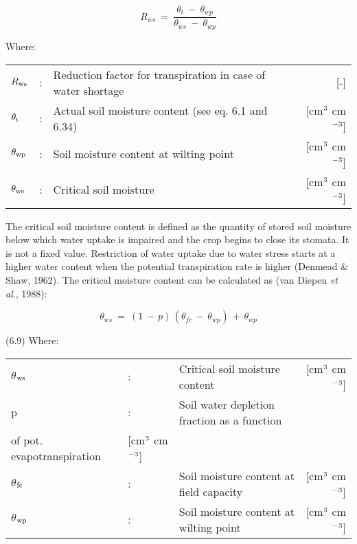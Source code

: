 \begin{equation}
R_{ws} ~=~{\frac{\theta  _{t} ~-~ \theta  _{wp} }{ \theta  _{ws} ~-~ \theta  _{wp} }}
\end{equation}

Where:\\
\begin{tabularx}{\textwidth}{llXr}
$R_{{\rm ws}}$ &:& Reduction factor for transpiration in case of
    water shortage & [-]\\
$\theta_{{\rm t}}$ &:& Actual soil moisture content (see eq. 6.1 and 
    6.34) & [cm$^{{\rm 3}}$ cm$^{{\rm -3}}$]\\
$\theta_{{\rm wp}}$ &:& Soil moisture content at wilting 
    point & [cm$^{{\rm 3}}$ cm$^{{\rm -3}}$]\\
$\theta_{{\rm ws}}$ &:& Critical soil moisture & [cm$^{{\rm 3}}$ cm$^{{\rm -3}}$]\\ 
\end{tabularx}



The critical soil moisture content is defined as the quantity of stored soil moisture below
which water uptake is impaired and the crop begins to close its stomata. It is not a fixed
value. Restriction of water uptake due to water stress starts at a higher water content
when the potential transpiration rate is higher (Denmead \& Shaw, 1962). The critical
moisture content can be calculated as (van Diepen {\it et al\/}., 1988):

\begin{equation}
\theta  _{ws} ~=~ (1\, -\, p )\, (\theta  _{fc} \, -\, \theta  _{wp} )\, +\, \theta  _{wp} 
\end{equation}

 
\strut\hfill (6.9)
Where:\\
\begin{tabularx}{\textwidth}{llXr}



 $\theta$$_{{\rm ws}}$ &:& Critical soil moisture content & [cm$^{{\rm 3}}$ cm$^{{\rm -3}}$]\\
 p &:& Soil water depletion fraction as a function \\
      of pot. evapotranspiration & [cm$^{{\rm 3}}$ cm$^{{\rm -3}}$]\\
 $\theta$$_{{\rm fc}}$ &:& Soil moisture content at field capacity & [cm$^{{\rm 3}}$ cm$^{{\rm -3}}$]\\
 $\theta$$_{{\rm wp}}$ &:& Soil moisture content at wilting point & [cm$^{{\rm 3}}$ cm$^{{\rm -3}}$]
\end{tabularx}








